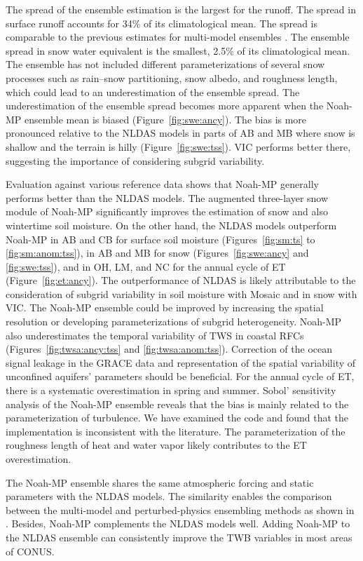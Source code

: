 \documentclass[essd, manuscript]{copernicus}
\begin{document}
The spread of the ensemble estimation is the largest for the runoff. The spread in surface runoff accounts for 34\% of its climatological mean. The spread is comparable to the previous estimates for multi-model ensembles \citep{dirmeyer2006BAMS}. The ensemble spread in snow water equivalent is the smallest, 2.5\% of its climatological mean. The ensemble has not included different parameterizations of several snow processes such as rain--snow partitioning, snow albedo, and roughness length, which could lead to an underestimation of the ensemble spread. The underestimation of the ensemble spread becomes more apparent when the Noah-MP ensemble mean is biased (Figure~\ref{fig:swe:ancy}). The bias is more pronounced relative to the NLDAS models in parts of AB and MB where snow is shallow and the terrain is hilly (Figure~\ref{fig:swe:tss}). VIC performs better there, suggesting the importance of considering subgrid variability.

Evaluation against various reference data shows that Noah-MP generally performs better than the NLDAS models. The augmented three-layer snow module of Noah-MP significantly improves the estimation of snow and also wintertime soil moisture. On the other hand, the NLDAS models outperform Noah-MP in AB and CB for surface soil moisture (Figures~\ref{fig:sm:ts} to \ref{fig:sm:anom:tss}), in AB and MB for snow (Figures~\ref{fig:swe:ancy} and \ref{fig:swe:tss}), and in OH, LM, and NC for the annual cycle of ET (Figure~\ref{fig:et:ancy}). The outperformance of NLDAS is likely attributable to the consideration of subgrid variability in soil moisture with Mosaic and in snow with VIC\@. The Noah-MP ensemble could be improved by increasing the spatial resolution or developing parameterizations of subgrid heterogeneity. Noah-MP also underestimates the temporal variability of TWS in coastal RFCs (Figures~\ref{fig:twsa:ancy:tss} and \ref{fig:twsa:anom:tss}). Correction of the ocean signal leakage in the GRACE data and representation of the spatial variability of unconfined aquifers' parameters should be beneficial. For the annual cycle of ET, there is a systematic overestimation in spring and summer. Sobol' sensitivity analysis of the Noah-MP ensemble reveals that the bias is mainly related to the parameterization of turbulence. We have examined the code and found that the implementation is inconsistent with the literature. The parameterization of the roughness length of heat and water vapor likely contributes to the ET overestimation.

The Noah-MP ensemble shares the same atmospheric forcing and static parameters with the NLDAS models. The similarity enables the comparison between the multi-model and perturbed-physics ensembling methods as shown in \citet{fei2021WRR}. Besides, Noah-MP complements the NLDAS models well. Adding Noah-MP to the NLDAS ensemble can consistently improve the TWB variables in most areas of CONUS\@.
\end{document}
